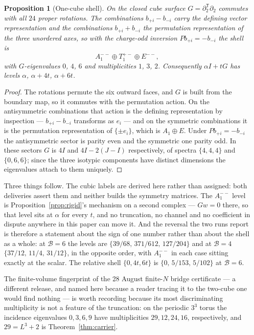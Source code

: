 \documentclass[11pt]{article}
\theoremstyle{plain}
\newtheorem{proposition}[theorem]{Proposition}
\theoremstyle{definition}
\theoremstyle{remark}
\newcommand{\chk}[1]{}
\begin{document}
\begin{proposition}[One-cube shell]\label{prop:cube}
On the closed cube surface $G=\partial_2^{\mathsf T}\partial_2$ commutes with
all $24$ proper rotations. The combinations $b_{+i}-b_{-i}$ carry the defining
vector representation and the combinations $b_{+i}+b_{-i}$ the permutation
representation of the three unordered axes, so with the charge-odd inversion
$Pb_{+i}=-b_{-i}$ the shell is
\[
  A_1^{--}\oplus T_1^{+-}\oplus E^{--},
\]
with $G$-eigenvalues $0$, $4$, $6$ and multiplicities $1$, $3$, $2$.
Consequently $\alpha I+tG$ has levels $\alpha$, $\alpha+4t$, $\alpha+6t$.
\end{proposition}

\begin{proof}
The rotations permute the six outward faces, and $G$ is built from the boundary
map, so it commutes with the permutation action. On the antisymmetric
combinations that action is the defining representation by inspection --- $b_{+i}-b_{-i}$
transforms as $e_i$ --- and on the symmetric combinations it is the
permutation representation of $\{\pm e_i\}$, which is $A_1\oplus E$. Under
$Pb_{+i}=-b_{-i}$ the antisymmetric sector is parity even and the symmetric one
parity odd. In these sectors $G$ is $4I$ and $4I-2(J-I)$ respectively, of
spectra $\{4,4,4\}$ and $\{0,6,6\}$; since the three isotypic components have
distinct dimensions the eigenvalues attach to them uniquely.
\end{proof}
\chk{the one-cube shell is A1 + T1 + E, and its flat level is the S\^{}2 fundamental class}

Three things follow. The cubic labels are derived here rather than assigned:
both deliveries assert them and neither builds the symmetry matrices. The
$A_1^{--}$ level is Proposition~\ref{prop:rigid}'s mechanism on a second
complex --- $Gw=0$ there, so that level sits at $\alpha$ for every $t$, and no truncation, no
channel and no coefficient in dispute anywhere in this paper can move it. And
the reversal the two runs report is therefore a statement about the sign of one
number rather than about the shell as a whole: at $\mathcal B=6$ the levels are
$\{39/68,\,371/612,\,127/204\}$ and at $\mathcal B=4$ $\{37/12,\,11/4,\,31/12\}$, in
the opposite order, with $A_1^{--}$ in each case sitting exactly at the scalar.
The relative shell $\{0,4t,6t\}$ is $\{0,\,5/153,\,5/102\}$ at $\mathcal B=6$.

The finite-volume fingerprint of the 28 August finite-$N$ bridge certificate
--- a different release, and named here because a reader tracing it to the
two-cube one would find nothing --- is worth recording
because its most discriminating multiplicity is not a feature of the
truncation: on the periodic $3^3$ torus the incidence eigenvalues $0,3,6,9$
have multiplicities $29,12,24,16$, respectively, and $29=L^3+2$ is
Theorem~\ref{thm:carrier}.
\chk{the certificate's finite-volume fingerprints, and 29 = L\^{}3 + 2 is the Lean cycle count}
\end{document}
